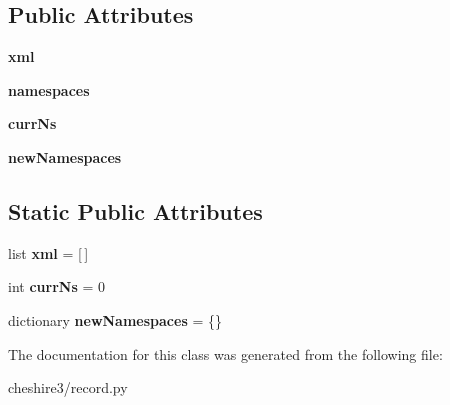 \subsection*{Public Attributes}
\begin{DoxyCompactItemize}
\item 
\hypertarget{classcheshire3_1_1record_1_1_sax_to_xml_handler_a0f0d826e332ec152d74961a4d9434ea1}{{\bfseries xml}}\label{classcheshire3_1_1record_1_1_sax_to_xml_handler_a0f0d826e332ec152d74961a4d9434ea1}

\item 
\hypertarget{classcheshire3_1_1record_1_1_sax_to_xml_handler_a6b244c42874212c9b452ef1a99201706}{{\bfseries namespaces}}\label{classcheshire3_1_1record_1_1_sax_to_xml_handler_a6b244c42874212c9b452ef1a99201706}

\item 
\hypertarget{classcheshire3_1_1record_1_1_sax_to_xml_handler_a2e9d155a2a86412d4662ad07a0a80b83}{{\bfseries curr\-Ns}}\label{classcheshire3_1_1record_1_1_sax_to_xml_handler_a2e9d155a2a86412d4662ad07a0a80b83}

\item 
\hypertarget{classcheshire3_1_1record_1_1_sax_to_xml_handler_aab8670746e9a0e4ec733270b1eb664d6}{{\bfseries new\-Namespaces}}\label{classcheshire3_1_1record_1_1_sax_to_xml_handler_aab8670746e9a0e4ec733270b1eb664d6}

\end{DoxyCompactItemize}
\subsection*{Static Public Attributes}
\begin{DoxyCompactItemize}
\item 
\hypertarget{classcheshire3_1_1record_1_1_sax_to_xml_handler_ad6c9060bc71c0e15aa14b4bf2a299cf8}{list {\bfseries xml} = \mbox{[}$\,$\mbox{]}}\label{classcheshire3_1_1record_1_1_sax_to_xml_handler_ad6c9060bc71c0e15aa14b4bf2a299cf8}

\item 
\hypertarget{classcheshire3_1_1record_1_1_sax_to_xml_handler_a6f09401c89d95fae97167c231d0b6dcb}{int {\bfseries curr\-Ns} = 0}\label{classcheshire3_1_1record_1_1_sax_to_xml_handler_a6f09401c89d95fae97167c231d0b6dcb}

\item 
\hypertarget{classcheshire3_1_1record_1_1_sax_to_xml_handler_a67d6561abdb0cca435ca48de1d0068e2}{dictionary {\bfseries new\-Namespaces} = \{\}}\label{classcheshire3_1_1record_1_1_sax_to_xml_handler_a67d6561abdb0cca435ca48de1d0068e2}

\end{DoxyCompactItemize}


The documentation for this class was generated from the following file\-:\begin{DoxyCompactItemize}
\item 
cheshire3/record.\-py\end{DoxyCompactItemize}
